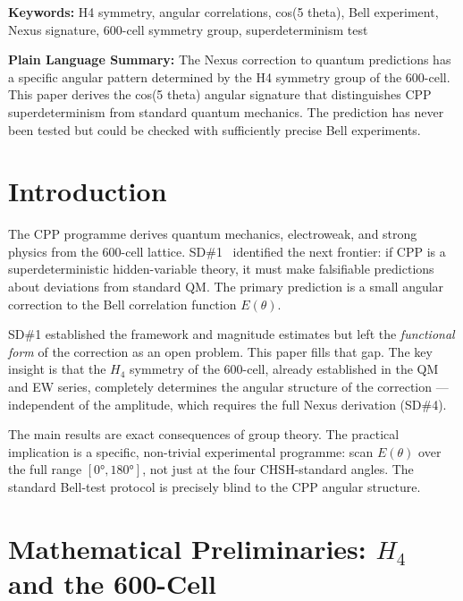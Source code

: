 \documentclass[11pt,letterpaper]{article}
\begin{document}
\medskip\noindent
\textbf{Keywords:} H4 symmetry, angular correlations, cos(5 theta), Bell experiment, Nexus signature, 600-cell symmetry group, superdeterminism test

\bigskip\noindent
\textbf{Plain Language Summary:}
The Nexus correction to quantum predictions has a specific angular pattern determined by the H4 symmetry group of the 600-cell. This paper derives the cos(5 theta) angular signature that distinguishes CPP superdeterminism from standard quantum mechanics. The prediction has never been tested but could be checked with sufficiently precise Bell experiments.

\bigskip
\raggedright


\tableofcontents
\newpage

\section{Introduction}

The CPP programme derives quantum mechanics, electroweak, and strong
physics from the 600-cell lattice.  SD\#1~\citep{cpp_sd1} identified
the next frontier: if CPP is a superdeterministic hidden-variable
theory, it must make falsifiable predictions about deviations from
standard QM.  The primary prediction is a small angular correction to
the Bell correlation function $E(\theta)$.

SD\#1 established the framework and magnitude estimates but left the
\emph{functional form} of the correction as an open problem.  This
paper fills that gap.  The key insight is that the $H_4$ symmetry of
the 600-cell, already established in the QM and EW series, completely
determines the angular structure of the correction --- independent of
the amplitude, which requires the full Nexus derivation (SD\#4).

The main results are exact consequences of group theory.  The
practical implication is a specific, non-trivial experimental
programme: scan $E(\theta)$ over the full range $[0°, 180°]$, not
just at the four CHSH-standard angles.  The standard Bell-test
protocol is precisely blind to the CPP angular structure.

\section{Mathematical Preliminaries: $H_4$ and the 600-Cell}
\end{document}

